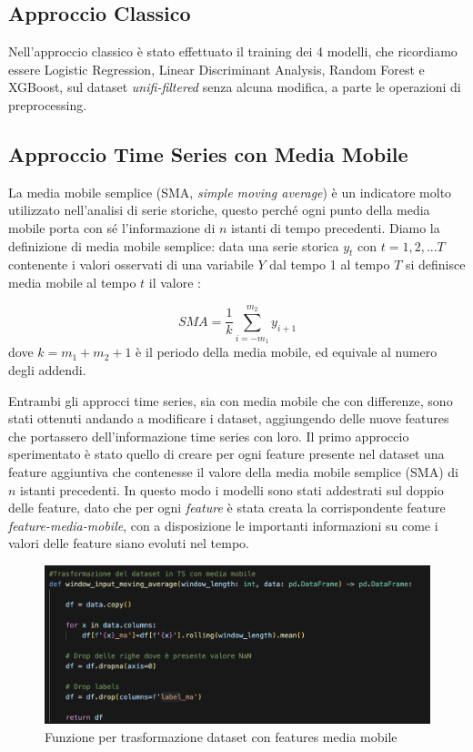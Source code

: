\subsection{Approccio Classico}
Nell'approccio classico \`e stato effettuato il training dei 4 modelli, che ricordiamo essere Logistic Regression, Linear Discriminant Analysis, Random Forest e XGBoost, sul dataset \textit{unifi-filtered} senza alcuna modifica, a parte le operazioni di preprocessing.

\subsection{Approccio Time Series con Media Mobile}
La media mobile semplice (SMA, \textit{simple moving average}) \`e un indicatore molto utilizzato nell'analisi di serie storiche, questo perch\'e ogni punto della media mobile porta con s\'e l'informazione di $n$ istanti di tempo precedenti. Diamo la definizione di media mobile semplice: data una serie storica $y_t$ con $t=1,2,...T$ contenente i valori osservati di una variabile $Y$ dal tempo 1 al tempo $T$ si definisce media mobile al tempo $t$ il valore \cite{sma}:

  \begin{equation}
      SMA=\frac{1}{k} \sum_{i=-m_1}^{m_2} y_{i+1}
  \end{equation}
dove $k=m_1+m_2+1$ \`e il periodo della media mobile, ed equivale al numero degli addendi.

Entrambi gli approcci time series, sia con media mobile che con differenze, sono stati ottenuti andando a modificare i dataset, aggiungendo delle nuove features che portassero dell'informazione time series con loro.
Il primo approccio sperimentato \`e stato quello di creare per ogni feature presente nel dataset una feature aggiuntiva che contenesse il valore della media mobile semplice (SMA) di $n$ istanti precedenti. In questo modo i modelli sono stati addestrati sul doppio delle feature, dato che per ogni \textit{feature} \`e stata creata la corrispondente feature \textit{feature-media-mobile}, con a disposizione le importanti informazioni su come i valori delle feature siano evoluti nel tempo. 

\begin{figure}[H]
    \centering
    \includegraphics[width=0.9\linewidth]{def_ts_ma.png}
    \caption{Funzione per trasformazione dataset con features media mobile}
    \label{fig:enter-label}
\end{figure}

